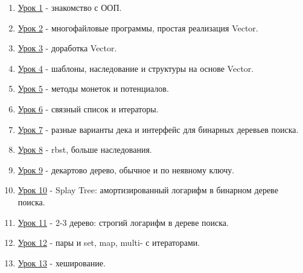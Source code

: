 \label{md2texREADME}
\begin{enumerate}
    \item \hyperref[md2tex1]{Урок 1} - знакомство с ООП.
    \item \hyperref[md2tex2]{Урок 2} - многофайловые программы, простая реализация Vector.
    \item \hyperref[md2tex3]{Урок 3} - доработка Vector.
    \item \hyperref[md2tex4]{Урок 4} - шаблоны, наследование и структуры на основе Vector.
    \item \hyperref[md2tex5]{Урок 5} - методы монеток и потенциалов.
    \item \hyperref[md2tex6]{Урок 6} - связный список и итераторы.
    \item \hyperref[md2tex7]{Урок 7} - разные варианты дека и интерфейс для бинарных деревьев поиска.
    \item \hyperref[md2tex8]{Урок 8} - rbst, больше наследования.
    \item \hyperref[md2tex9]{Урок 9} - декартово дерево, обычное и по неявному ключу.
    \item \hyperref[md2tex10]{Урок 10} - Splay Tree: амортизированный логарифм в бинарном дереве поиска.
    \item \hyperref[md2tex11]{Урок 11} - 2-3 дерево: строгий логарифм в дереве поиска.
    \item \hyperref[md2tex12]{Урок 12} - пары и set, map, multi- с итераторами.
    \item \hyperref[md2tex13]{Урок 13} - хеширование.
\end{enumerate}
